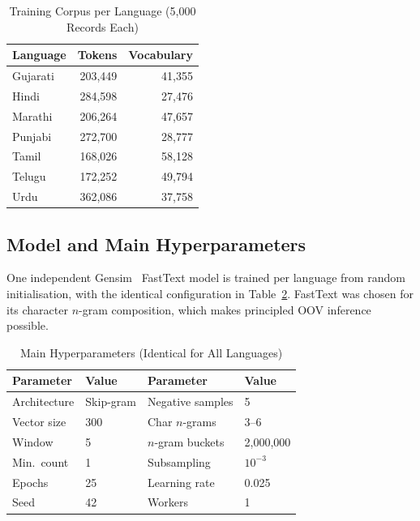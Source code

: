 \documentclass[conference,10pt]{IEEEtran}
\begin{document}
\begin{table}[!t]
\caption{Training Corpus per Language (5,000 Records Each)}
\label{tab:corpus}
\centering
\renewcommand{\arraystretch}{1.2}
\footnotesize
\begin{tabular}{|l|r|r|}
\hline
\rowcolor{srcblue!15}
\textbf{Language} & \textbf{Tokens} & \textbf{Vocabulary} \\
\hline
Gujarati & 203,449 & 41,355 \\
\hline
Hindi & 284,598 & 27,476 \\
\hline
Marathi & 206,264 & 47,657 \\
\hline
Punjabi & 272,700 & 28,777 \\
\hline
Tamil & 168,026 & 58,128 \\
\hline
Telugu & 172,252 & 49,794 \\
\hline
Urdu & 362,086 & 37,758 \\
\hline
\end{tabular}
\end{table}

\subsection{Model and Main Hyperparameters}\label{sec:model}
One independent Gensim~\cite{rehurek2010} FastText model is trained per language from random initialisation, with the identical configuration in Table~\ref{tab:hparams}. FastText was chosen for its character $n$-gram composition, which makes principled OOV inference possible.

\begin{table}[!t]
\caption{Main Hyperparameters (Identical for All Languages)}
\label{tab:hparams}
\centering
\renewcommand{\arraystretch}{1.2}
\footnotesize
\begin{tabular}{|l|l||l|l|}
\hline
\rowcolor{srcblue!15}
\textbf{Parameter} & \textbf{Value} & \textbf{Parameter} & \textbf{Value} \\
\hline
Architecture & Skip-gram & Negative samples & 5 \\
\hline
Vector size & 300 & Char $n$-grams & 3--6 \\
\hline
Window & 5 & $n$-gram buckets & 2,000,000 \\
\hline
Min.\ count & 1 & Subsampling & $10^{-3}$ \\
\hline
Epochs & 25 & Learning rate & 0.025 \\
\hline
Seed & 42 & Workers & 1 \\
\hline
\end{tabular}
\end{table}
\end{document}
